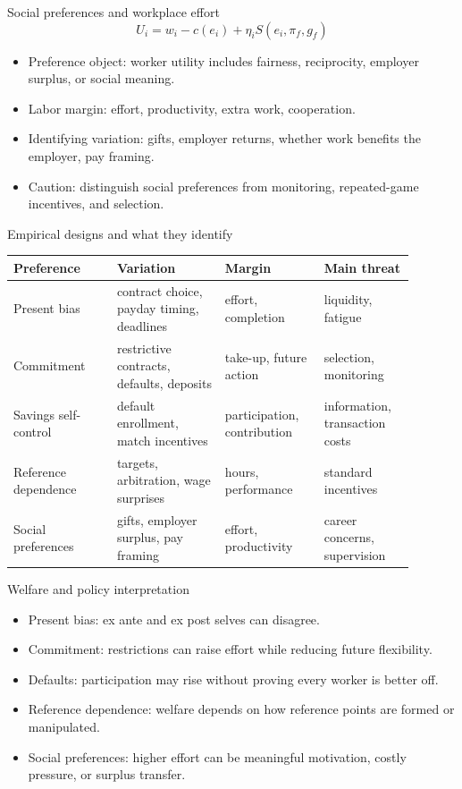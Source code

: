 \documentclass[aspectratio=169,11pt]{beamer}
\begin{document}
\begin{frame}{Social preferences and workplace effort}
\[
U_i = w_i - c(e_i) + \eta_i S(e_i,\pi_f,g_f)
\]

\begin{itemize}
    \item Preference object: worker utility includes fairness, reciprocity, employer surplus, or social meaning.
    \item Labor margin: effort, productivity, extra work, cooperation.
    \item Identifying variation: gifts, employer returns, whether work benefits the employer, pay framing.
    \item Caution: distinguish social preferences from monitoring, repeated-game incentives, and selection.
\end{itemize}
\end{frame}

\begin{frame}{Empirical designs and what they identify}
\scriptsize
\begin{tabular}{p{0.23\linewidth} p{0.24\linewidth} p{0.22\linewidth} p{0.20\linewidth}}
\toprule
Preference & Variation & Margin & Main threat \\
\midrule
Present bias & contract choice, payday timing, deadlines & effort, completion & liquidity, fatigue \\
Commitment & restrictive contracts, defaults, deposits & take-up, future action & selection, monitoring \\
Savings self-control & default enrollment, match incentives & participation, contribution & information, transaction costs \\
Reference dependence & targets, arbitration, wage surprises & hours, performance & standard incentives \\
Social preferences & gifts, employer surplus, pay framing & effort, productivity & career concerns, supervision \\
\bottomrule
\end{tabular}
\end{frame}

\begin{frame}{Welfare and policy interpretation}
\begin{itemize}
    \item Present bias: ex ante and ex post selves can disagree.
    \item Commitment: restrictions can raise effort while reducing future flexibility.
    \item Defaults: participation may rise without proving every worker is better off.
    \item Reference dependence: welfare depends on how reference points are formed or manipulated.
    \item Social preferences: higher effort can be meaningful motivation, costly pressure, or surplus transfer.
\end{itemize}
\end{frame}
\end{document}
